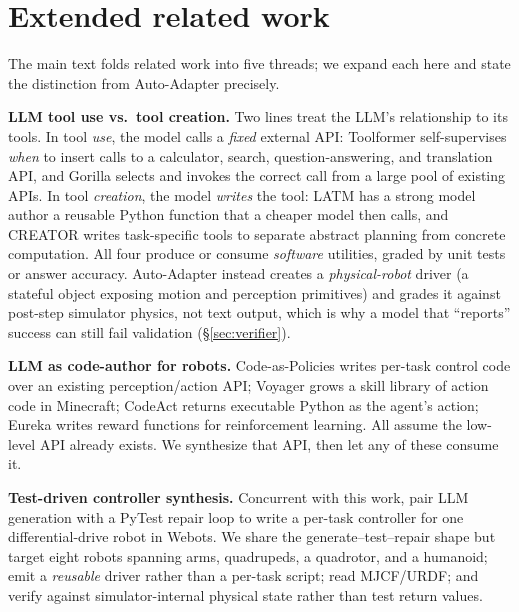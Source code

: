 \section{Extended related work}
\label{app:related}

The main text folds related work into five threads; we expand each
here and state the distinction from Auto-Adapter precisely.

\noindent\textbf{LLM tool use vs.\ tool creation.} Two lines treat
the LLM's relationship to its tools. In tool \emph{use}, the model
calls a \emph{fixed} external API: Toolformer
\citep{schick2023toolformer} self-supervises \emph{when} to insert
calls to a calculator, search, question-answering, and translation
API, and Gorilla \citep{patil2023gorilla} selects and invokes the
correct call from a large pool of existing APIs. In tool
\emph{creation}, the model \emph{writes} the tool: LATM
\citep{cai2023latm} has a strong model author a reusable Python
function that a cheaper model then calls, and CREATOR
\citep{qian2023creator} writes task-specific tools to separate
abstract planning from concrete computation. All four produce or
consume \emph{software} utilities, graded by unit tests or answer
accuracy. Auto-Adapter instead creates a \emph{physical-robot}
driver (a stateful object exposing motion and perception
primitives) and grades it against post-step simulator physics, not
text output, which is why a model that ``reports'' success can still
fail validation (\S\ref{sec:verifier}).

\noindent\textbf{LLM as code-author for robots.} Code-as-Policies
\citep{liang2023codeaspolicies} writes per-task control code over an
existing perception/action API; Voyager \citep{wang2023voyager}
grows a skill library of action code in Minecraft; CodeAct
\citep{wang2024codeact} returns executable Python as the agent's
action; Eureka \citep{ma2024eureka} writes reward functions for
reinforcement learning. All assume the low-level API already exists.
We synthesize that API, then let any of these consume it.

\noindent\textbf{Test-driven controller synthesis.} Concurrent with
this work, \citet{tripathi2026testdriven} pair LLM generation with a
PyTest repair loop to write a per-task controller for one
differential-drive robot in Webots. We share the
generate--test--repair shape but target eight robots spanning arms,
quadrupeds, a quadrotor, and a humanoid; emit a \emph{reusable}
driver rather than a per-task script; read MJCF/URDF; and verify
against simulator-internal physical state rather than test return
values.

